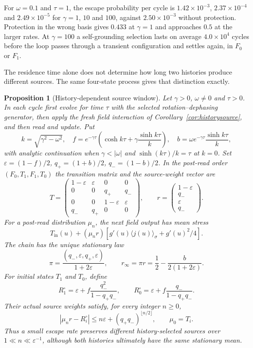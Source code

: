 \documentclass[12pt,a4paper]{article}
\newtheorem{proposition}[theorem]{Proposition}
\begin{document}
For $\omega=0.1$ and $\tau=1$, the escape probability per cycle is $1.42\times10^{-3}$, $2.37\times10^{-4}$ and $2.49\times10^{-5}$ for $\gamma=1$, $10$ and $100$, against $2.50\times10^{-3}$ without protection. Protection in the wrong basis gives $0.433$ at $\gamma=1$ and approaches $0.5$ at the larger rates. At $\gamma=100$ a self-grounding selection lasts on average $4.0\times10^4$ cycles before the loop passes through a transient configuration and settles again, in $F_0$ or $F_1$.

The residence time alone does not determine how long two histories produce different sources. The same four-state process gives that distinction exactly.

\begin{proposition}[History-dependent source window]
\label{prop:sourcewindow}
Let $\gamma>0$, $\omega\ne0$ and $\tau>0$. In each cycle first evolve for time $\tau$ with the selected rotation--dephasing generator, then apply the fresh field interaction of Corollary~\ref{cor:historysource}, and then read and update. Put
\[
 k=\sqrt{\gamma^2-\omega^2},\quad
 f=e^{-\gamma\tau}\left(\cosh k\tau+
                    \gamma\frac{\sinh k\tau}{k}\right),\quad
 b=\omega e^{-\gamma\tau}\frac{\sinh k\tau}{k},
\]
with analytic continuation when $\gamma<|\omega|$ and $\sinh(k\tau)/k=\tau$ at $k=0$. Set $\varepsilon=(1-f)/2$, $q_+=(1+b)/2$, $q_-=(1-b)/2$. In the post-read order $(F_0,T_1,F_1,T_0)$ the transition matrix and the source-weight vector are
\begin{equation}
 T=\begin{pmatrix}
 1-\varepsilon&\varepsilon&0&0\\
 0&0&q_+&q_-\\
 0&0&1-\varepsilon&\varepsilon\\
 q_-&q_+&0&0
 \end{pmatrix},\qquad
 r=\begin{pmatrix}1-\varepsilon\\q_-\\\varepsilon\\q_-\end{pmatrix}.
 \label{eq:sampledsource}
\end{equation}
For a post-read distribution $\mu_n$, the next field output has mean stress
\[
 T_{\mathrm{in}}(u)+(\mu_n r)
       \left[g'(u)\langle j(u)\rangle_\sigma+g'(u)^2/4\right].
\]
The chain has the unique stationary law
\[
 \pi=\frac{(q_-,\varepsilon,q_+,\varepsilon)}{1+2\varepsilon},
 \qquad r_\infty=\pi r=
 \frac12-\frac{b}{2(1+2\varepsilon)}.
\]
For initial states $T_1$ and $T_0$, define
\[
 R^\circ_1=\varepsilon+f\frac{q_-^2}{1-q_+q_-},\qquad
 R^\circ_0=\varepsilon+f\frac{q_-}{1-q_+q_-}.
\]
Their actual source weights satisfy, for every integer $n\ge0$,
\begin{equation}
 |\mu_n r-R^\circ_i|
 \le n\varepsilon+(q_+q_-)^{\lfloor n/2\rfloor},
 \qquad \mu_0=T_i.
 \label{eq:historywindow}
\end{equation}
Thus a small escape rate preserves different history-selected sources over $1\ll n\ll\varepsilon^{-1}$, although both histories ultimately have the same stationary mean.
\end{proposition}
\end{document}
